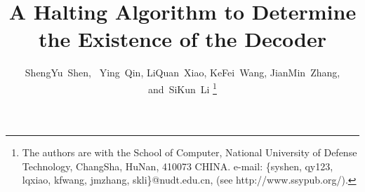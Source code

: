 \documentclass[journal]{IEEEtran}
\begin{document}
%
\title{A Halting Algorithm to Determine the Existence of the Decoder}
%
%
%

\author{ShengYu~Shen,~
        Ying~Qin,
        LiQuan~Xiao,
        KeFei~Wang,
        JianMin~Zhang,
        and~SiKun~Li%
\thanks{The authors are with the School of Computer,
National University of Defense Technology, ChangSha,
HuNan, 410073 CHINA. e-mail: \{syshen, qy123, lqxiao, kfwang, jmzhang, skli\}@nudt.edu.cn, (see http://www.ssypub.org/).}%
}
%
%
\end{document}
